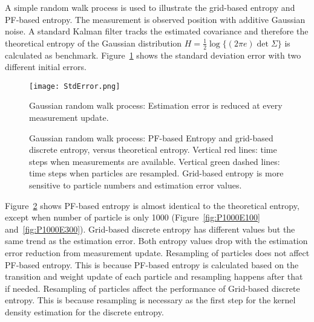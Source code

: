 A simple random walk process is used to illustrate the grid-based entropy and PF-based entropy. The measurement is observed position with additive Gaussian noise. A standard Kalman filter tracks the estimated covariance and therefore the theoretical entropy of the Gaussian distribution $H=\frac{1}{2}\log\{(2\pi e)\det{{\Sigma}} \}$ is calculated as benchmark. Figure~\ref{fig:StdError} shows the standard deviation error with two different initial errors.

\begin{figure}[htbp]
\centering
\texttt{[image: StdError.png]}
\caption{Gaussian random walk process: Estimation error is reduced at every measurement update.}
\label{fig:StdError}
\end{figure}
\begin{figure}[!t]
\begin{center}
\caption{Gaussian random walk process: PF-based Entropy and grid-based discrete entropy, versus theoretical entropy. Vertical red lines: time steps when measurements are available. Vertical green dashed lines: time steps when particles are resampled. Grid-based entropy is more sensitive to particle numbers and estimation error values.}
\label{fig:convergence2Dexample}
\end{center}
\end{figure}

Figure~\ref{fig:convergence2Dexample} shows PF-based entropy is almost identical to the theoretical entropy, except when number of particle is only 1000 (Figure~\ref{fig:P1000E100} and~\ref{fig:P1000E300}). Grid-based discrete entropy has different values but the same trend as the estimation error. Both entropy values drop with the estimation error reduction from measurement update. Resampling of particles does not affect PF-based entropy. This is because PF-based entropy is calculated based on the transition and weight update of each particle and resampling happens after that if needed. Resampling of particles affect the performance of Grid-based discrete entropy. This is because resampling is necessary as the first step for the kernel density estimation for the discrete entropy.

